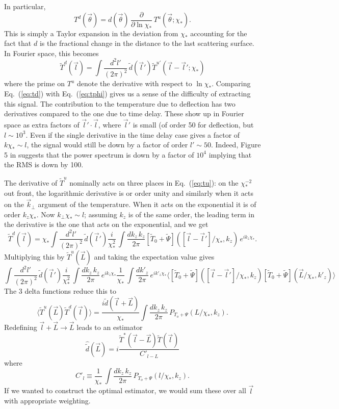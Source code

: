 \documentclass[prd,amsmath,amssymb,floatfix,superscriptaddress,nofootinbib,preprintnumbers]{revtex4-1}
\def\be{\begin{equation}}
\def\ee{\end{equation}}
\newcommand{\ec}[1]{Eq.~(\ref{eq:#1})}
\newcommand{\eql}[1]{\label{eq:#1}}
\begin{document}
In particular,
\be
T^d(\vec\theta) = d(\vec\theta)\,\frac{\partial}{\partial\ln\chi_*}\, T^u(\vec\theta;\chi_*).
\ee
This is simply a Taylor expansion in the deviation from $\chi_*$ accounting for the fact that $d$ is the fractional change in the distance to the last scattering surface. In Fourier space, this becomes
\begin{equation}
\tilde T^d(\vec l) = \int \frac{d^2l'}{(2\pi)^2}\, \tilde d(\vec l') \tilde T^{u'}(\vec l-\vec l';\chi_*) %
\eql{td}\end{equation}
where the prime on $T^u$ denote the  derivative with respect to $\ln\chi_*$. Comparing \ec{td} with \ec{tphi}  gives us a sense of the difficulty of extracting this signal. The contribution to the temperature due to deflection has two derivatives compared to the one due to time delay. These show up in Fourier space as extra factors of $\vec l'\cdot\vec l$, where $\vec l'$ is small (of order 50 for deflection, but $l\sim 10^3$. Even if the single derivative in the time delay case gives a factor of $k\chi_*\sim l$, the signal would still be down by a factor of order $l'\sim50$. Indeed, Figure 5 in \cite{Hu:2001yq} suggests that the power spectrum is down by a factor of $10^4$ implying that the RMS is down by 100. %

The derivative of $\tilde T^u$ nominally acts on three places in \ec{tu}: on the $\chi_*^{-2}$ out front, the logarithmic derivative is or order unity and similarly when it acts on the $\vec k_\perp$ argument of the temperature. When it acts on the exponential it is of order $k_z\chi_*$. Now $k_\perp\chi_*\sim l$; assuming $k_z$ is of the same order, the leading term in the derivative is the one that acts on the exponential, and we get
\begin{equation}
\tilde T^d(\vec l) = \chi_*\int \frac{d^2l'}{(2\pi)^2}\, \tilde d(\vec l')
\frac{i}{\chi_*^2}\, \int \frac{dk_z\,k_z}{2\pi}  [\tilde T_0+\tilde\Psi]([\vec l-\vec l']/\chi_*,k_z)\,e^{ik_z\chi_*}.
\end{equation}
Multiplying this by $\tilde T^u(\vec L)$ and taking the expectation value gives
\be
\int \frac{d^2l'}{(2\pi)^2}\, \tilde d(\vec l')
\frac{i}{\chi_*^2}\, \int \frac{dk_z\,k_z}{2\pi}  \,e^{ik_z\chi_*}
\frac{1}{\chi_*}\, \int \frac{dk'_z}{2\pi} \,e^{ik'_z\chi_*}
 \langle [\tilde T_0+\tilde\Psi]([\vec l-\vec l']/\chi_*,k_z)  [\tilde T_0+\tilde\Psi](\vec L/\chi_*,k'_z)\rangle
 \ee
 The 3 delta functions reduce this to
 \be
 \langle \tilde T^u(\vec L) \tilde T^d(\vec l) \rangle
 = \frac{i\tilde d(\vec l + \vec L)}{\chi_*} \int \frac{dk_z\,k_z}{2\pi} \, P_{T_o+\Psi}(L/\chi_*,k_z)
. \ee
 Redefining $\vec l + \vec L \rightarrow \vec L$ leads to an estimator
 \be
 \hat{\tilde d}(\vec L) = i \frac{\tilde T^*(\vec l-\vec L) \tilde T(\vec l)}{C'_{l-L}}
 \ee
 where
 \be
 C'_l \equiv  \frac{1}{\chi_*}\, \int \frac{dk_z\,k_z}{2\pi} \, P_{T_o+\Psi}(l/\chi_*,k_z)
 .\ee
If we wanted to construct the optimal estimator, we would sum these over all $\vec l$ with appropriate weighting.
\end{document}

